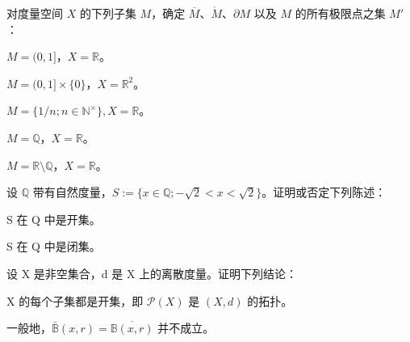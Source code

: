 \exerciseshead

\begin{exercises}
\item

对度量空间 $X$ 的下列子集 $M$，确定 $\overline{M}$、$\mathring{M}$、$\partial M$ 以及 $M$ 的所有极限点之集 $M'$：

\begin{items}
\item

$ M = (0, 1] $，$ X = \mathbb{R} $。

\item

$ M = (0,1] \times \{0\} $，$ X = \mathbb{R}^2 $。

\item

$ M = \{1/n; n \in \mathbb{N}^\times\}, X = \mathbb{R} $。

\item

$ M = \mathbb{Q} $，$ X = \mathbb{R} $。

\item

$ M = \mathbb{R} \setminus \mathbb{Q} $，$ X = \mathbb{R} $。

\end{items}

\item

设 $ \mathbb{Q} $ 带有自然度量，$ S := \{ x \in \mathbb{Q} ; -\sqrt{2} < x < \sqrt{2} \} $。证明或否定下列陈述：

\begin{items}
\item

S 在 Q 中是开集。

\item

S 在 Q 中是闭集。

\end{items}

\item

设 X 是非空集合，d 是 X 上的离散度量。证明下列结论：

\begin{items}
\item

X 的每个子集都是开集，即 $ \mathcal{P}(X) $ 是 $ (X, d) $ 的拓扑。

\item

一般地，$ \bar{\mathbb{B}}(x,r)=\overline{\mathbb{B}(x,r)} $ 并不成立。


\end{items}
\end{exercises}
